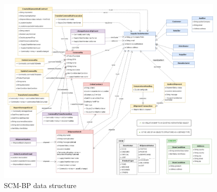 

\begin{figure}[H]
\begin{center}
  \includegraphics[scale=0.95]{images/classDiagram.png}
\caption{\ac{SCM-BP} data structure}
\label{fig:dataStructure}
\end{center}
\end{figure}